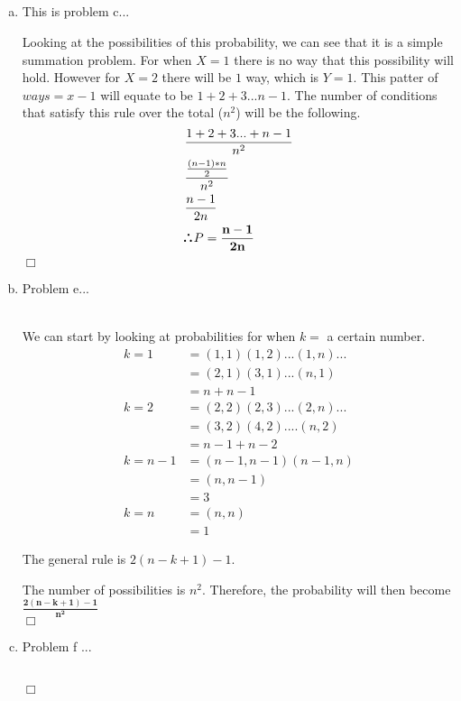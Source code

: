 \documentclass[10pt]{report}
\newenvironment{proof}{\par\noindent{\it Proof.}\hspace*{1em}}{$\Box$\bigskip}
\def\therefore{\boldsymbol{\text{ }
\leavevmode
\lower0.4ex\hbox{$\cdot$}
\kern-.5em\raise0.7ex\hbox{$\cdot$}
\kern-0.6em\lower0.4ex\hbox{$\cdot$}
\thinspace\text{ }}}
\begin{document}
    \subsection{}
 \begin{enumerate}[(a)]
 \item This is problem c...
 \begin{proof}
 Looking at the possibilities of this probability, we can see that it is a simple summation problem. For when $X=1$ there is no way that this possibility will hold. However for $X=2$ there will be $1 $ way, which is $Y=1$. This patter of $ways = x-1$ will equate to be $1 + 2 + 3 ... n-1 $. The number of conditions that satisfy this rule over the total ($n^2$) will be the following.
 \begin{align*}
 &\frac{1+2+3...+n-1}{n^2} \\
 &\frac{\frac{(n-1)*n}{2}}{n^2}\\
 &\frac{n-1}{2n}\\
 &\therefore P= \mathbf{\frac{n-1}{2n}}
 \end{align*}
 \end{proof}
 \item Problem e...
 \begin{proof} \ \\
 We can start by looking at probabilities for when $k=$ a certain number.
 \begin{align*}
 k = 1 &= (1,1) (1,2) ... (1,n) ... \\
 &= (2,1) (3,1) ... (n,1) \\
 & = n + n -1 \\
 k=2 &= (2,2) (2,3) ...(2,n)...\\
 &= (3,2) (4,2) .... (n, 2) \\
 &= n-1 + n -2 \\
 k= n -1 &= (n-1, n-1) (n-1, n) \\
 &= (n, n-1) \\
 &= 3 \\
 k = n &= (n,n) \\
 &= 1
 \end{align*}
 \begin{center}
 The general rule is $2(n-k+1)-1 $.
 \end{center}
 The number of possibilities is $n^2$. Therefore, the probability will then become $\mathbf{\frac{2(n-k+1)-1 }{n^2}}$ \\
 \end{proof}
 \item Problem f ...
 \begin{proof}\\

\end{proof}
\end{enumerate}
\end{document}
